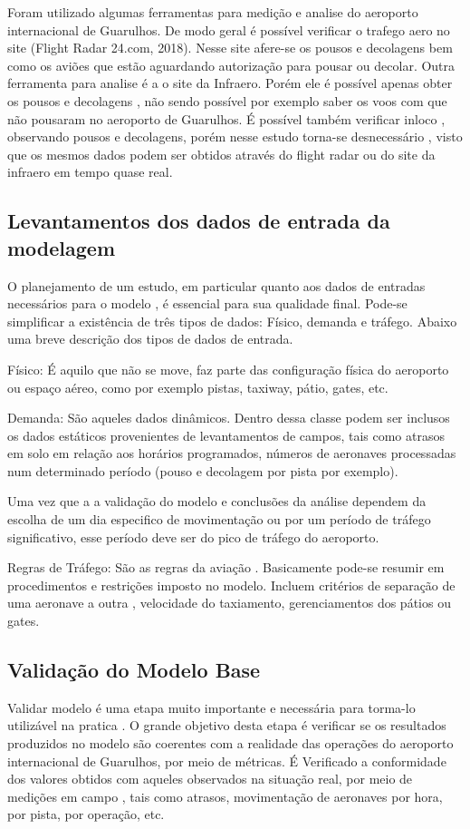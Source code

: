 \documentclass[12pt]{article}
\begin{document}
Foram utilizado algumas ferramentas para medição e analise do aeroporto 
internacional de Guarulhos. De modo geral é possível verificar o trafego
aero no site (Flight Radar 24.com, 2018). Nesse site afere-se os pousos 
e decolagens bem como os aviões que estão aguardando autorização para pousar
ou decolar. Outra ferramenta para analise é a o site da Infraero. Porém 
ele é possível apenas obter os pousos e decolagens , não sendo possível
por exemplo saber os voos com que não pousaram no aeroporto de Guarulhos.
É possível também verificar inloco , observando pousos e decolagens, porém
nesse estudo torna-se desnecessário , visto que os mesmos dados podem ser
obtidos através do flight radar ou do site da infraero em tempo quase
real.

\subsection{Levantamentos dos dados de entrada da modelagem}

O planejamento de um estudo, em particular quanto aos dados de entradas
necessários para o modelo , é essencial para sua qualidade final. Pode-se
simplificar a existência de três tipos de dados: Físico, demanda e tráfego. 
Abaixo uma breve descrição dos tipos de dados de entrada.

Físico: É aquilo que não se move, faz parte das configuração física do 
aeroporto ou espaço aéreo, como por exemplo pistas, taxiway, pátio, gates, etc.

Demanda: São aqueles dados dinâmicos. Dentro dessa classe podem ser inclusos os 
dados estáticos provenientes de levantamentos de campos, tais como
atrasos em solo em relação aos horários programados, números de aeronaves
processadas num determinado período (pouso e decolagem por pista por 
exemplo).

Uma vez que a a validação do modelo e conclusões da análise dependem da
escolha de um dia especifico de movimentação ou por um período de tráfego
significativo, esse período deve ser do pico de tráfego do aeroporto.

Regras de Tráfego: São as regras da aviação . Basicamente pode-se resumir
em procedimentos e restrições imposto no modelo. Incluem critérios de 
separação de uma aeronave a outra , velocidade do taxiamento, gerenciamentos
dos pátios ou gates.


\subsection{Validação do Modelo Base}
Validar modelo é uma etapa muito importante e necessária para torma-lo 
utilizável na pratica . O grande objetivo desta etapa é verificar se os
resultados produzidos no modelo são coerentes com a realidade das operações
do aeroporto internacional de Guarulhos, por meio de métricas. 
É Verificado a conformidade dos valores obtidos com aqueles observados na
situação real, por meio de medições em campo , tais como atrasos,
movimentação de aeronaves por hora, por pista, por operação, etc.
\end{document}

